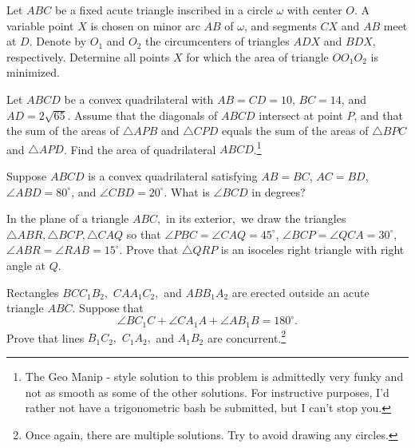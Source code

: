 \documentclass[11pt]{article}
\begin{document}
\begin{prob}[USAMO 2020/1]{9}
Let $ABC$ be a fixed acute triangle inscribed in a circle $\omega$ with center $O$. A variable point $X$ is chosen on minor arc $AB$ of $\omega$, and segments $CX$ and $AB$ meet at $D$. Denote by $O_1$ and $O_2$ the circumcenters of triangles $ADX$ and $BDX$, respectively. Determine all points $X$ for which the area of triangle $OO_1O_2$ is minimized.
\end{prob}
\begin{prob}[AIME II 2018/12]{9}
Let $ABCD$ be a convex quadrilateral with $AB=CD=10$, $BC=14$, and $AD=2\sqrt{65}$. Assume that the diagonals of $ABCD$ intersect at point $P$, and that the sum of the areas of $\triangle APB$ and $\triangle CPD$ equals the sum of the areas of $\triangle BPC$ and $\triangle APD$. Find the area of quadrilateral $ABCD$.\footnote{The Geo Manip - style solution to this problem is admittedly very funky and not as smooth as some of the other solutions. For instructive purposes, I'd rather not have a trigonometric bash be submitted, but I can't stop you.}
\end{prob}

\begin{req}{13}
Suppose $ABCD$ is a convex quadrilateral satisfying $AB=BC$, $AC=BD$, $\angle ABD = 80^\circ$, and $\angle CBD = 20^\circ$. What is $\angle BCD$ in degrees?
\end{req}
\begin{prob}[IMO 1975/3]{13}
In the plane of a triangle $ABC,$ in its exterior$,$ we draw the triangles $\triangle ABR, \triangle BCP, \triangle CAQ$ so that $\angle PBC = \angle CAQ = 45^{\circ}$, $\angle BCP = \angle QCA = 30^{\circ}$, $\angle ABR = \angle RAB = 15^{\circ}$.
Prove that $\triangle QRP$ is an isoceles right triangle with right angle at $Q$.
\end{prob}
\begin{prob}[USAMO 2021/1]{13}
Rectangles $BCC_1B_2,$ $CAA_1C_2,$ and $ABB_1A_2$ are erected outside an acute triangle $ABC.$ Suppose that\[\angle BC_1C+\angle CA_1A+\angle AB_1B=180^{\circ}.\]Prove that lines $B_1C_2,$ $C_1A_2,$ and $A_1B_2$ are concurrent.\footnote{Once again, there are multiple solutions. Try to avoid drawing any circles.}
\end{prob}
\end{document}
